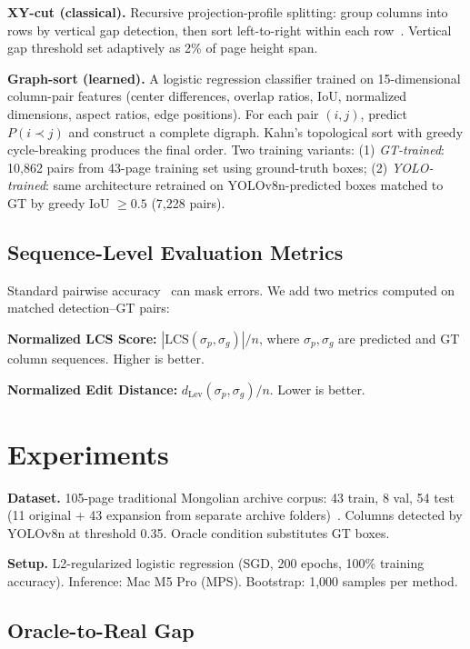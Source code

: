 \documentclass[5p,times,twocolumn]{elsarticle}
\begin{document}
\textbf{XY-cut (classical).} Recursive projection-profile splitting: group columns into rows by vertical gap detection, then sort left-to-right within each row~\cite{ha1995recursive}. Vertical gap threshold set adaptively as 2\% of page height span.

\textbf{Graph-sort (learned).} A logistic regression classifier trained on 15-dimensional column-pair features (center differences, overlap ratios, IoU, normalized dimensions, aspect ratios, edge positions). For each pair $(i,j)$, predict $P(i \prec j)$ and construct a complete digraph. Kahn's topological sort with greedy cycle-breaking produces the final order. Two training variants: (1) \textit{GT-trained}: 10,862 pairs from 43-page training set using ground-truth boxes; (2) \textit{YOLO-trained}: same architecture retrained on YOLOv8n-predicted boxes matched to GT by greedy IoU $\ge 0.5$ (7,228 pairs).

\subsection{Sequence-Level Evaluation Metrics}
Standard pairwise accuracy~\cite{quiros2022reading} can mask errors. We add two metrics computed on matched detection--GT pairs:

\textbf{Normalized LCS Score:} $|\mathrm{LCS}(\sigma_p, \sigma_g)| / n$, where $\sigma_p, \sigma_g$ are predicted and GT column sequences. Higher is better.

\textbf{Normalized Edit Distance:} $d_{\mathrm{Lev}}(\sigma_p, \sigma_g) / n$. Lower is better.

\section{Experiments}
\textbf{Dataset.} 105-page traditional Mongolian archive corpus: 43 train, 8 val, 54 test (11 original + 43 expansion from separate archive folders)~\cite{liang2025pilot}. Columns detected by YOLOv8n at threshold 0.35. Oracle condition substitutes GT boxes.

\textbf{Setup.} L2-regularized logistic regression (SGD, 200 epochs, 100\% training accuracy). Inference: Mac M5 Pro (MPS). Bootstrap: 1,000 samples per method.

\subsection{Oracle-to-Real Gap}
\end{document}
